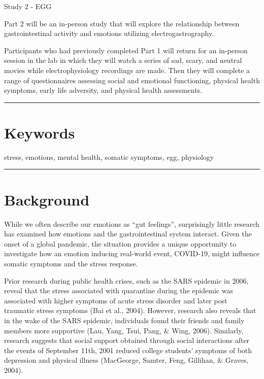 \documentclass[]{book}
\begin{document}
Study 2 - EGG

Part 2 will be an in-person study that will explore the relationship between gastrointestinal activity and emotions utilizing electrogastrography.

Participants who had previously completed Part 1 will return for an in-person session in the lab in which they will watch a series of sad, scary, and neutral movies while electrophysiology recordings are made. Then they will complete a range of questionnaires assessing social and emotional functioning, physical health symptoms, early life adversity, and physical health assessments.

\begin{center}\rule{0.5\linewidth}{0.5pt}\end{center}

\hypertarget{keywords}{%
\section{Keywords}\label{keywords}}

stress, emotions, mental health, somatic symptoms, egg, physiology

\begin{center}\rule{0.5\linewidth}{0.5pt}\end{center}

\hypertarget{background}{%
\section{Background}\label{background}}

While we often describe our emotions as ``gut feelings'', surprisingly little research has examined how emotions and the gastrointestinal system interact. Given the onset of a global pandemic, the situation provides a unique opportunity to investigate how an emotion inducing real-world event, COVID-19, might influence somatic symptoms and the stress response.

Prior research during public health crises, such as the SARS epidemic in 2006, reveal that the stress associated with quarantine during the epidemic was associated with higher symptoms of acute stress disorder and later post traumatic stress symptoms (Bai et al., 2004). However, research also reveals that in the wake of the SARS epidemic, individuals found their friends and family members more supportive (Lau, Yang, Tsui, Pang, \& Wing, 2006). Similarly, research suggests that social support obtained through social interactions after the events of September 11th, 2001 reduced college students' symptoms of both depression and physical illness (MacGeorge, Samter, Feng, Gillihan, \& Graves, 2004).
\end{document}
